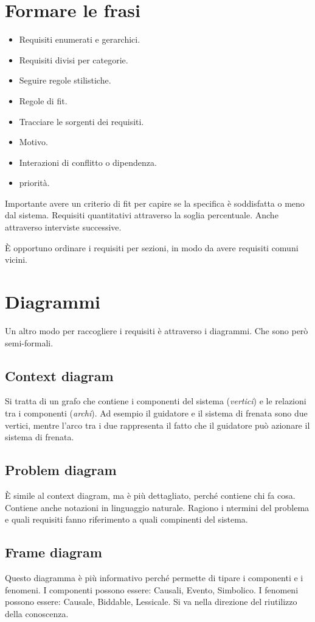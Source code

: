 \section{Formare le frasi}
\begin{itemize}
    \item Requisiti enumerati e gerarchici.
    \item Requisiti divisi per categorie.
    \item Seguire regole stilistiche.
    \item Regole di fit.
    \item Tracciare le sorgenti dei requisiti.
    \item Motivo.
    \item Interazioni di conflitto o dipendenza.
    \item priorità.
\end{itemize}
Importante avere un criterio di fit per capire se la specifica 
è soddisfatta o meno dal sistema.
Requisiti quantitativi attraverso la soglia percentuale.
Anche attraverso interviste successive.

È opportuno ordinare i requisiti per sezioni, 
in modo da avere requisiti comuni vicini.

\section{Diagrammi}
Un altro modo per raccogliere i requisiti è attraverso i diagrammi.
Che sono però semi-formali.

\subsection{Context diagram}
Si tratta di un grafo che contiene i componenti del sistema (\textit{vertici})
e le relazioni tra i componenti (\textit{archi}).
Ad esempio il guidatore e il sistema di frenata sono due vertici,
mentre l'arco tra i due rappresenta il fatto che il guidatore
può azionare il sistema di frenata.
\subsection{Problem diagram}
È simile al context diagram, ma è più dettagliato, perché
contiene chi fa cosa.
Contiene anche notazioni in linguaggio naturale.
Ragiono i ntermini del problema e quali requisiti fanno 
riferimento a quali compinenti del sistema.
\subsection{Frame diagram}
Questo diagramma è più informativo perché permette 
di tipare i componenti e i fenomeni.
I componenti possono essere: Causali, Evento, Simbolico.
I fenomeni possono essere: Causale, Biddable, Lessicale.
Si va nella direzione del riutilizzo della conoscenza.

